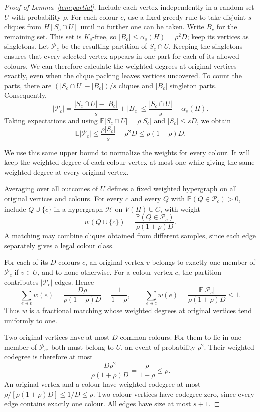 \documentclass[11pt]{article}
\numberwithin{equation}{section}
\newcommand{\Prob}{\mathbb P}
\newcommand{\E}{\mathbb E}
\begin{document}
\begin{proof}[Proof of Lemma~\ref{lem:partial}]
  
Include each vertex independently in a random set $U$ with probability $\rho$. For each colour $c$, use a fixed greedy rule to take disjoint $s$-cliques from $H[S_c\cap U]$ until no further one can be taken. Write $B_c$ for the remaining set. This set is $K_s$-free, so $|B_c|\le\alpha_s(H)=\rho^2D$; keep its vertices as singletons. Let $\mathcal P_c$ be the resulting partition of $S_c\cap U$. Keeping the singletons ensures that every selected vertex appears in one part for each of its allowed colours. We can therefore calculate the weighted degrees at original vertices exactly, even when the clique packing leaves vertices uncovered. To count the parts, there are $(|S_c\cap U|-|B_c|)/s$ cliques and $|B_c|$ singleton parts. Consequently,
\[
 |\mathcal P_c|
 =\frac{|S_c\cap U|-|B_c|}{s}+|B_c|
 \le\frac{|S_c\cap U|}{s}+\alpha_s(H).
\]
Taking expectations and using $\E|S_c\cap U|=\rho|S_c|$ and $|S_c|\le sD$, we obtain
\[
 \E|\mathcal P_c|
 \le\frac{\rho|S_c|}{s}+\rho^2D
 \le\rho(1+\rho)D.
\]
 
We use this same upper bound to normalize the weights for every colour. It will keep the weighted degree of each colour vertex at most one while giving the same weighted degree at every original vertex.

Averaging over all outcomes of $U$ defines a fixed weighted hypergraph on all original vertices and colours. For every $c$ and every $Q$ with $\Prob(Q\in\mathcal P_c)>0$, include $Q\cup\{c\}$ in a hypergraph $\mathcal H$ on $V(H)\cup C$, with weight
\[
 w(Q\cup\{c\})
 =\frac{\Prob(Q\in\mathcal P_c)}{\rho(1+\rho)D}.
\]
A matching may combine cliques obtained from different samples, since each edge separately gives a legal colour class.

For each of its $D$ colours $c$, an original vertex $v$ belongs to exactly one member of $\mathcal P_c$ if $v\in U$, and to none otherwise. For a colour vertex $c$, the partition contributes $|\mathcal P_c|$ edges. Hence
\[
 \sum_{e\ni v}w(e)
 =\frac{D\rho}{\rho(1+\rho)D}
 =\frac1{1+\rho},
 \qquad
 \sum_{e\ni c}w(e)
 =\frac{\E|\mathcal P_c|}{\rho(1+\rho)D}\le1.
\]
Thus $w$ is a fractional matching whose weighted degrees at original vertices tend uniformly to one.

Two original vertices have at most $D$ common colours. For them to lie in one member of $\mathcal P_c$, both must belong to $U$, an event of probability $\rho^2$. Their weighted codegree is therefore at most
\[
 \frac{D\rho^2}{\rho(1+\rho)D}
 =\frac{\rho}{1+\rho}\le\rho.
\]
An original vertex and a colour have weighted codegree at most $\rho/[\rho(1+\rho)D]\le1/D\le\rho$. Two colour vertices have codegree zero, since every edge contains exactly one colour. All edges have size at most $s+1$.


\end{proof}
\end{document}
